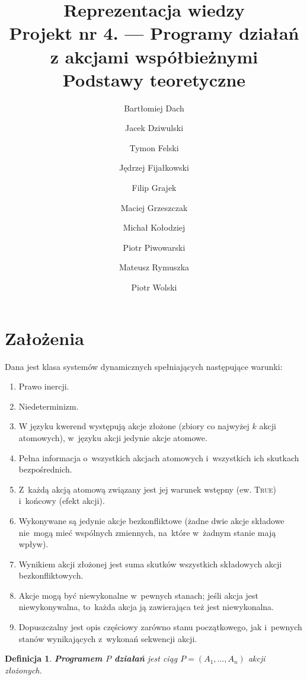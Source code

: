 \documentclass[11pt,a4paper]{article}
\newtheorem{defn}{Definicja}
\begin{document}
\title{Reprezentacja wiedzy \\
\Large{
    Projekt nr 4. --- Programy działań z akcjami współbieżnymi \\
    Podstawy teoretyczne
}}
\author{
    Bartłomiej Dach \and
    Jacek Dziwulski \and
    Tymon Felski \and
    Jędrzej Fijałkowski \and
    Filip Grajek \and
    Maciej Grzeszczak \and
    Michał Kołodziej \and
    Piotr Piwowarski \and
    Mateusz Rymuszka \and
    Piotr Wolski
}
\maketitle

\section{Założenia}

Dana jest klasa systemów dynamicznych spełniających następujące warunki:

\begin{enumerate}
    \item Prawo inercji.
    \item Niedeterminizm.
    \item W języku kwerend występują akcje złożone (zbiory co najwyżej $k$ akcji atomowych), w~języku akcji jedynie akcje atomowe.
    \item Pełna informacja o~wszystkich akcjach atomowych i~wszystkich ich skutkach bezpośrednich.
    \item Z~każdą akcją atomową związany jest jej warunek wstępny (ew. \textsc{True}) i~końcowy (efekt akcji).
    \item Wykonywane są jedynie akcje bezkonfliktowe (żadne dwie akcje składowe nie~mogą mieć wspólnych zmiennych, na~które w~żadnym stanie mają wpływ).
    \item Wynikiem akcji złożonej jest suma skutków wszystkich składowych akcji bezkonfliktowych.
    \item Akcje mogą być niewykonalne w~pewnych stanach; jeśli akcja jest niewykonywalna, to~każda akcja ją zawierająca też jest niewykonalna.
    \item Dopuszczalny jest opis częściowy zarówno stanu początkowego, jak i~pewnych stanów wynikających z~wykonań sekwencji akcji.
\end{enumerate}

\begin{defn}
    \textbf{Programem $P$ działań} jest ciąg $P = (A_1, \dots,A_n)$ akcji złożonych.
\end{defn}
\end{document}
